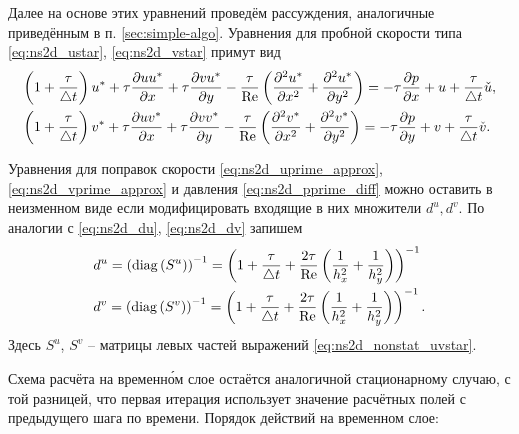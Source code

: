 Далее на основе этих уравнений проведём рассуждения, аналогичные приведённым в п. \ref{sec:simple-algo}.
Уравнения для пробной скорости типа \eqref{eq:ns2d_ustar}, \eqref{eq:ns2d_vstar}
примут вид
\begin{equation}
    \label{eq:ns2d_nonstat_uvstar}
    \begin{array}{l}
    \displaystyle
    \left(1 + \frac{\tau}{\triangle t}\right)u^* + \tau\frac{\partial u u^*}{\partial x} + \tau\frac{\partial v u^*}{\partial y}
       - \frac{\tau}{\mathrm{Re}}\left(\frac{\partial^2 u^*}{\partial x^2} + \frac{\partial^2 u^*}{\partial y^2}\right)
       = -\tau\frac{\partial p}{\partial x} + u + \frac\tau{\triangle t} \check u, \\[10pt]
    \displaystyle
    \left(1 + \frac{\tau}{\triangle t}\right)v^* + \tau\frac{\partial u v^*}{\partial x} + \tau\frac{\partial v v^*}{\partial y}
       - \frac{\tau}{\mathrm{Re}}\left(\frac{\partial^2 v^*}{\partial x^2} + \frac{\partial^2 v^*}{\partial y^2}\right)
       = -\tau\frac{\partial p}{\partial y} + v + \frac\tau{\triangle t} \check v.
   \end{array}
\end{equation}

Уравнения для поправок скорости \eqref{eq:ns2d_uprime_approx}, \eqref{eq:ns2d_vprime_approx}
и давления \eqref{eq:ns2d_pprime_diff}
можно оставить в неизменном виде если модифицировать входящие в них множители $d^u, d^v$.
По аналогии с \eqref{eq:ns2d_du}, \eqref{eq:ns2d_dv} запишем
\begin{equation}
    \label{eq:ns2d_nonstat_duv}
    \begin{array}{l}
    \displaystyle
    d^u = \left({\rm diag}\left(S^u\right)\right)^{-1} = 
        \left(1 + \frac\tau{\triangle t} + \frac{2\tau}{\mathrm{Re}}\left(\frac{1}{h_x^2} + \frac{1}{h_y^2}\right)\right)^{-1} \\[10pt]
    \displaystyle
    d^v = \left({\rm diag}\left(S^v\right) \right)^{-1}= 
        \left(1 + \frac\tau{\triangle t} + \frac{2\tau}{\mathrm{Re}}\left(\frac{1}{h_x^2} + \frac{1}{h_y^2}\right)\right)^{-1}.
    \end{array}
\end{equation}
Здесь $S^u$, $S^v$ -- матрицы левых частей выражений \eqref{eq:ns2d_nonstat_uvstar}.

Схема расчёта на временн\'{о}м слое остаётся аналогичной стационарному случаю,
с той разницей, что первая итерация использует значение расчётных полей
с предыдущего шага по времени.
Порядок действий на временном слое:

